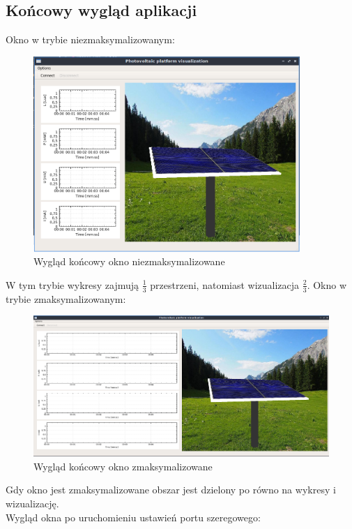 \documentclass[10pt, a4paper]{article}
\begin{document}
	\subsection{Końcowy wygląd aplikacji}
	Okno w trybie niezmaksymalizowanym: 
		\begin{figure}[H]
			\centering
			\includegraphics[width=0.9\textwidth]{figures/oknoGlowneMin.png}
			\caption{Wygląd końcowy okno niezmaksymalizowane}
			\label{fig:minimalized}
		\end{figure}
	W tym trybie wykresy zajmują $\frac{1}{3}$ przestrzeni, natomiast wizualizacja $\frac{2}{3}$. \newpage
	Okno w trybie zmaksymalizowanym:
		\begin{figure}[H]
			\centering
			\includegraphics[width=1.0\textwidth]{figures/oknoGlowneMax.png}
			\caption{Wygląd końcowy okno zmaksymalizowane}
			\label{fig:maxymalized}
		\end{figure}
	Gdy okno jest zmaksymalizowane obszar jest dzielony po równo na wykresy i wizualizację. \\
	Wygląd okna po uruchomieniu ustawień portu szeregowego:
\end{document}
